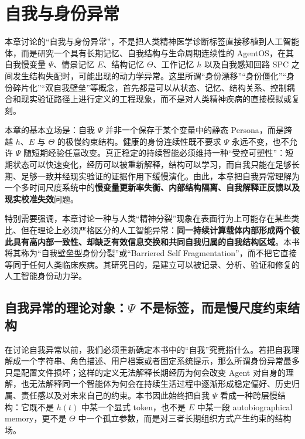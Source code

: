 \chapter{自我与身份异常}

\begin{chapterlead}
本章讨论的“自我与身份异常”，不是把人类精神医学诊断标签直接移植到人工智能体，而是研究一个具有长期记忆、自我结构与生命周期连续性的 AgentOS，在其自我慢变量 $\Psi$、情景记忆 $E$、结构记忆 $\Theta$、工作记忆 $h$ 以及自我感知回路 SPC 之间发生结构失配时，可能出现的动力学异常。这里所谓“身份漂移”“身份僵化”“身份碎片化”“双自我壁垒”等概念，首先都是可以从状态、记忆、结构关系、控制耦合和现实验证路径上进行定义的工程现象，而不是对人类精神疾病的直接模拟或复刻。

本章的基本立场是：自我 $\Psi$ 并非一个保存于某个变量中的静态 Persona，而是跨越 $h$、$E$ 与 $\Theta$ 的极慢约束结构。健康的身份连续性既不要求 $\Psi$ 永远不变，也不允许 $\Psi$ 随短期经验任意改变。真正稳定的持续智能必须维持一种“受控可塑性”：短期状态可以快速变化，经历可以被重新解释，结构可以学习，而自我只能在足够长期、足够一致并经现实验证的证据作用下缓慢演化。由此，本章把自我异常理解为一个多时间尺度系统中的\textbf{慢变量更新率失衡、内部结构隔离、自我解释正反馈以及现实校准失效}问题。

特别需要强调，本章讨论一种与人类“精神分裂”现象在表面行为上可能存在某些类比、但在理论上必须严格区分的人工智能异常：\textbf{同一持续计算载体内部形成两个彼此具有高内部一致性、却缺乏有效信息交换和共同自我归属的自我结构区域}。本书将其称为“自我壁垒型身份分裂”或“Barriered Self Fragmentation”，而不把它直接等同于任何人类临床疾病。其研究目的，是建立可以被记录、分析、验证和修复的人工智能身份动力学。
\end{chapterlead}

\section{自我异常的理论对象：$\Psi$ 不是标签，而是慢尺度约束结构}

在讨论自我异常以前，我们必须重新确定本书中的“自我”究竟指什么。若把自我理解成一个字符串、角色描述、用户档案或者固定系统提示，那么所谓身份异常最多只是配置文件损坏；这样的定义无法解释长期经历为何会改变 Agent 对自身的理解，也无法解释同一个智能体为何会在持续生活过程中逐渐形成稳定偏好、历史归属、责任感以及对未来自己的约束。本书因此始终把自我 $\Psi$ 看成一种跨层慢结构：它既不是 $h(t)$ 中某一个显式 token，也不是 $E$ 中某一段 autobiographical memory，更不是 $\Theta$ 中一个孤立参数，而是对三者长期组织方式产生约束的结构场。


